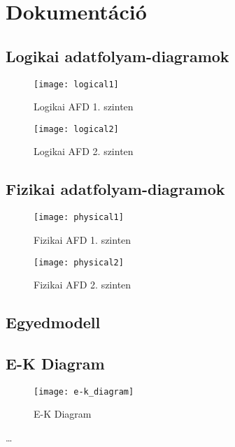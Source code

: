 \section{Dokumentáció}\label{sec:dokumentacio}

\subsection{Logikai adatfolyam-diagramok}

\begin{figure}[!htb]

    \centering
    \texttt{[image: logical1]}
    \caption{\label{fig:logical1}Logikai AFD 1. szinten}

\end{figure}

\begin{figure}[!htb]

    \centering
    \texttt{[image: logical2]}
    \caption{\label{fig:logical2}Logikai AFD 2. szinten}

\end{figure}

\subsection{Fizikai adatfolyam-diagramok}

\begin{figure}[!htb]

    \centering
    \texttt{[image: physical1]}
    \caption{\label{fig:physical1}Fizikai AFD 1. szinten}

\end{figure}

\begin{figure}[!htb]

    \centering
    \texttt{[image: physical2]}
    \caption{\label{fig:physical2}Fizikai AFD 2. szinten}

\end{figure}

\subsection{Egyedmodell}

\subsection{E-K Diagram}

\begin{figure}[!htb]

    \centering
    \texttt{[image: e-k\_diagram]}
    \caption{\label{fig:e-k_diagram}E-K Diagram}

\end{figure}
\ldots
